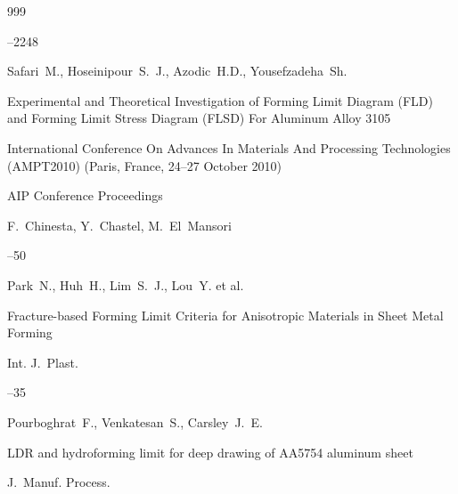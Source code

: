 \begin{thebibliography}{999}



–2248






\by Safari~M., Hoseinipour~S.~J.,  Azodic~H.D., Yousefzadeha~Sh. 

\paper Experimental and Theoretical Investigation of Forming Limit Diagram (FLD) and Forming Limit Stress Diagram (FLSD) For Aluminum Alloy 3105

\inbook International Conference On Advances In Materials And Processing Technologies (AMPT2010) \rm (Paris, France, 24–27 October 2010)

\serial AIP Conference Proceedings

\ed F.~Chinesta, Y.~Chastel, M.~El~Mansori




--50






\by Park~N., Huh~H., Lim~S.~J., Lou~Y. et al.

\paper Fracture-based Forming Limit Criteria for Anisotropic Materials in Sheet Metal Forming

\jour Int. J.~Plast. 



--35






\by Pourboghrat~F., Venkatesan~S., Carsley~J.~E. 

\paper LDR and hydroforming limit for deep drawing of AA5754 aluminum sheet

\jour J.~Manuf. Process.





\end{thebibliography}
